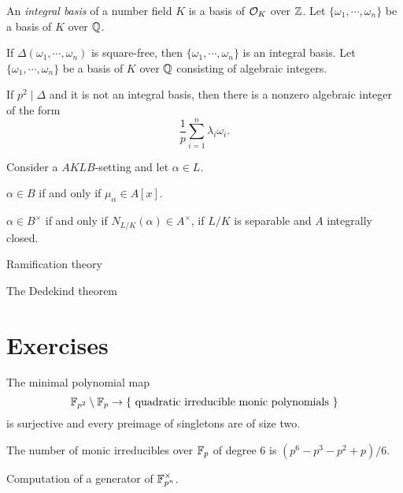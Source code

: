 \documentclass{../../large}
\begin{document}
\begin{prb}
An \emph{integral basis} of a number field $K$ is a basis of $\mathcal{O}_K$ over $\mathbb{Z}$.
Let $\{\omega_1,\cdots,\omega_n\}$ be a basis of $K$ over $\mathbb{Q}$.

If $\Delta(\omega_1,\cdots,\omega_n)$ is square-free, then $\{\omega_1,\cdots,\omega_n\}$ is an integral basis.
Let $\{\omega_1,\cdots,\omega_n\}$ be a basis of $K$ over $\mathbb{Q}$ consisting of algebraic integers.

If $p^2\mid\Delta$ and it is not an integral basis, then there is a nonzero algebraic integer of the form
\[\frac1p\sum_{i=1}^n\lambda_i\omega_i.\]
\end{prb}

\begin{prb}
\end{prb}


Consider a $AKLB$-setting and let $\alpha\in L$.
\begin{parts}
\item $\alpha\in B$ if and only if $\mu_\alpha\in A[x]$.
\item $\alpha\in B^\times$ if and only if $N_{L/K}(\alpha)\in A^\times$, if $L/K$ is separable and $A$ integrally closed.
\end{parts}




{Ramification theory}

{The Dedekind theorem}


\section*{Exercises}
\begin{prb}
The minimal polynomial map
\[\mathbb{F}_{p^2}\setminus\mathbb{F}_p\to\{\text{ quadratic irreducible monic polynomials }\}\]
is surjective and every preimage of singletons are of size two.
\begin{parts}
\item The number of monic irreducibles over $\mathbb{F}_p$ of degree 6 is $(p^6-p^3-p^2+p)/6$.
\end{parts}
\end{prb}

\begin{prb}
Computation of a generator of $\mathbb{F}_{p^n}^\times$.
\end{prb}

\begin{prb}
\end{prb}
\end{document}

